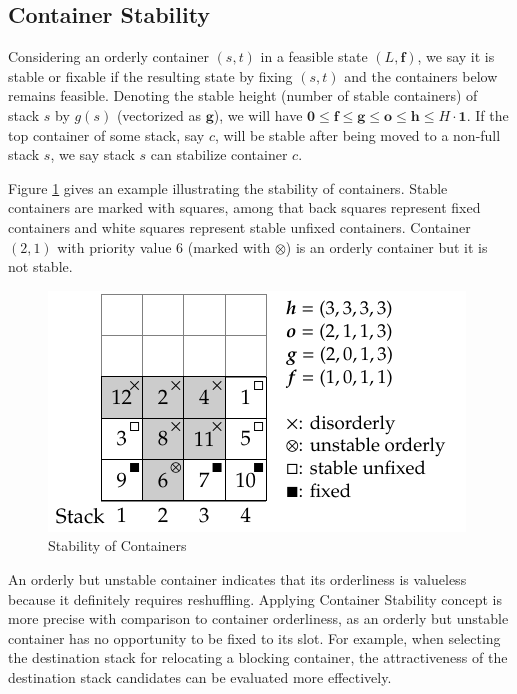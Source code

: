 \documentclass{article}
\begin{document}
\subsection{Container Stability}
\label{cpmp:sec:stable}
Considering an orderly container $(s,t)$ in a feasible state $(L,\boldsymbol{f})$, we say it is stable or fixable if the resulting state by fixing $(s,t)$ and the containers below remains feasible.
Denoting the stable height (number of stable containers) of stack $s$ by $ g(s)$ (vectorized as $\boldsymbol{g}$), we will have $\boldsymbol{0}\le \boldsymbol{f}\le \boldsymbol{g}\le \boldsymbol{o}\le \boldsymbol{h}\le H\cdot\boldsymbol{1}$. If the top container of some stack, say $c$, will be stable after being moved to a non-full stack $s$, we say stack $s$ can stabilize container $c$. 

Figure \ref{cpmp:fig:stable} gives an example illustrating the stability of containers. Stable containers are marked with squares, among that back squares represent fixed containers and white squares represent stable unfixed containers. Container $(2,1)$ with priority value $6$ (marked with $\otimes$) is an orderly container but it is not stable.

\begin{figure}[htbp]
\centering
\includegraphics{figures/stable.pdf}
\caption{Stability of Containers}
\label{cpmp:fig:stable}
\end{figure}


An orderly but unstable container indicates that its orderliness is valueless because it definitely requires reshuffling.
Applying Container Stability concept is more precise with comparison to container orderliness, as an orderly but unstable container has no opportunity to be fixed to its slot.
For example, when selecting the destination stack for relocating a blocking container, the attractiveness of the destination stack candidates can be evaluated more effectively.
\end{document}
